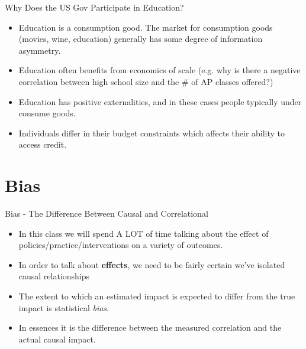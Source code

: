 \documentclass{beamer}
\begin{document}
\begin{frame}{Why Does the US Gov Participate in Education?}
    \begin{itemize}
        \item Education is a consumption good. The market for consumption goods (movies, wine, education) generally has some degree of information asymmetry.
        \item Education often benefits from economics of scale (e.g. why is there a negative correlation between high school size and the \# of AP classes offered?)
        \item Education has positive externalities, and in these cases people typically under consume goods. 
        \item Individuals differ in their budget constraints which affects their ability to access credit. 
    \end{itemize}
    
\end{frame}

\section{Bias}
\frame{\sectionpage}


\begin{frame}{Bias - The Difference Between Causal and Correlational}
\begin{itemize}
    \item In this class we will spend A LOT of time talking about the effect of policies/practice/interventions on a variety of outcomes.
    \item In order to talk about \textbf{effects}, we need to be fairly certain we've isolated causal relationships
    \item The extent to which an estimated impact is expected to differ from the true impact is statistical \textit{bias}.
    \item In essences it is the difference between the measured correlation and the actual causal impact.

\end{itemize}
\end{frame}
\end{document}
